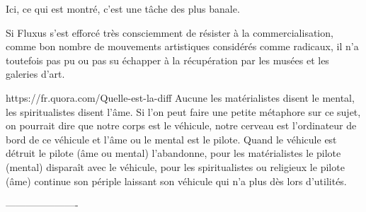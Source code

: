 Ici, ce qui est montré, c’est une tâche des plus banale.

Si Fluxus s’est efforcé très consciemment de résister à la commercialisation, comme bon nombre de mouvements artistiques considérés comme radicaux, il n'a toutefois pas pu ou pas su échapper à la récupération par les musées et les galeries d'art. 

https://fr.quora.com/Quelle-est-la-diff%
Aucune les matérialistes disent le mental, les spiritualistes disent l’âme. Si l’on peut faire une petite métaphore sur ce sujet, on pourrait dire que notre corps est le véhicule, notre cerveau est l’ordinateur de bord de ce véhicule et l’âme ou le mental est le pilote. Quand le véhicule est détruit le pilote (âme ou mental) l’abandonne, pour les matérialistes le pilote (mental) disparaît avec le véhicule, pour les spiritualistes ou religieux le pilote (âme) continue son périple laissant son véhicule qui n’a plus dès lors d’utilités.

----------------------

